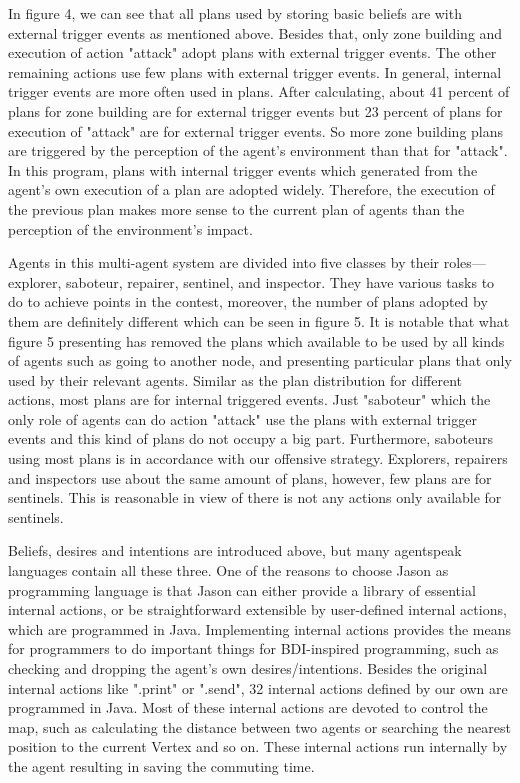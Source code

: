 \documentclass{llncs}
\begin{document}
In figure 4, we can see that all plans used by storing basic beliefs are with external trigger events as mentioned above. Besides that, only zone building and execution of action "attack" adopt plans with external trigger events. The other remaining actions use few plans with external trigger events. In general, internal trigger events are more often used in plans. After calculating, about 41 percent of plans for zone building are for external trigger events but 23 percent of plans for execution of "attack" are for external trigger events. So more zone building plans are triggered by the perception of the agent’s environment than that for "attack". In this program, plans with internal trigger events which generated from the agent’s own execution of a plan are adopted widely. Therefore, the execution of the previous plan makes more sense to the current plan of agents than the perception of the environment's impact.

Agents in this multi-agent system are divided into five classes by their roles---explorer, saboteur, repairer, sentinel, and inspector. They have various tasks to do to achieve points in the contest, moreover, the number of plans adopted by them are definitely different which can be seen in figure 5. It is notable that what figure 5 presenting has removed the plans which available to be used by all kinds of agents such as going to another node, and presenting particular plans that only used by their relevant agents. Similar as the plan distribution for different actions, most plans are for internal triggered events. Just "saboteur" which the only role of agents can do action "attack" use the plans with external trigger events and this kind of plans do not occupy a big part.
Furthermore, saboteurs using most plans is in accordance with our offensive strategy. Explorers, repairers and inspectors use about the same amount of plans, however, few plans are for sentinels. This is reasonable in view of there is not any actions only available for sentinels.

Beliefs, desires and intentions are introduced above, but many agentspeak languages contain all these three. One of the reasons to choose Jason as programming language is that Jason can either provide a library of essential internal actions, or be straightforward extensible by user-defined internal actions, which are programmed in Java\cite{rafael_Javabased_2007}. Implementing internal actions provides the means for programmers to do important things for BDI-inspired programming, such as checking and dropping the agent’s own
desires/intentions\cite{rafael_overviewjason_2006}. Besides the original internal actions like ".print" or ".send", 32 internal actions defined by our own are programmed in Java. Most of these internal actions are devoted to control the map, such as calculating the distance between two agents or searching the nearest position to the current Vertex and so on. These internal actions run internally by the agent resulting in saving the commuting time.
\end{document}
